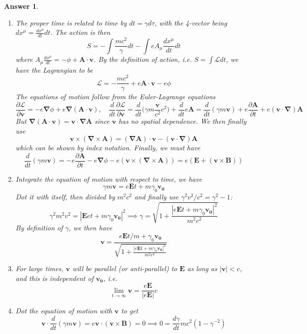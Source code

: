 \documentclass[a4paper]{article}
\newtheorem{ans}{Answer}[section]
\theoremstyle{new}
\begin{document}
\begin{ans}\leavevmode
\begin{enumerate}[label=(\alph*)]
\item The proper time is related to time by $dt=\gamma d\tau$, with the 4-vector being $dx^\mu=\frac{dx^\mu}{dt}dt$. The action is then
$$S=-\int\frac{mc^2}{\gamma}dt-\int eA_\mu\frac{dx^\mu}{dt}dt$$
where $A_\mu\frac{dx^\mu}{dt}=-\phi+\mathbf{A}\cdot\mathbf{v}$. By the definition of action, i.e. $S=\int\mathcal{L}dt$, we have the Lagrangian to be
$$\mathcal{L}=-\frac{mc^2}{\gamma}+e\mathbf{A}\cdot\mathbf{v}-e\phi$$
The equations of motion follow from the Euler-Lagrange equations
$$\frac{\partial\mathcal{L}}{\partial\mathbf{v}}=-e\boldsymbol{\nabla}\phi+e\boldsymbol{\nabla}(\mathbf{A}\cdot\mathbf{v}),\quad\frac{d}{dt}\frac{\partial\mathcal{L}}{\partial\mathbf{v}}=\frac{d}{dt}\bigg(\gamma m\frac{\mathbf{v}}{c^2}c^2\bigg)+\frac{d}{dt}e\mathbf{A}=\frac{d}{dt}(\gamma m\mathbf{v})+e\frac{\partial\mathbf{A}}{\partial t}+e(\mathbf{v}\cdot\boldsymbol{\nabla})\mathbf{A}$$
But $\boldsymbol{\nabla}(\mathbf{A}\cdot\mathbf{v})=\mathbf{v}\cdot\boldsymbol{\nabla}\mathbf{A}$ since $\mathbf{v}$ has no spatial dependence. We then finally use
$$\mathbf{v}\times(\boldsymbol{\nabla}\times\mathbf{A})=(\boldsymbol{\nabla}\mathbf{A})\cdot\mathbf{v}-(\mathbf{v}\cdot\boldsymbol{\nabla})\mathbf{A}$$
which can be shown by index notation. Finally, we must have
$$\frac{d}{dt}(\gamma m\mathbf{v})=-e\frac{\partial\mathbf{A}}{\partial t}-e\boldsymbol{\nabla}\phi-e(\mathbf{v}\times(\boldsymbol{\nabla}\times\mathbf{A}))=e(\mathbf{E}+(\mathbf{v}\times\mathbf{B}))$$
\item Integrate the equation of motion with respect to time, we have
$$\gamma m\mathbf{v}=e\mathbf{E}t+m\gamma_0\mathbf{v_0}$$
Dot it with itself, then divided by $m^2c^2$ and finally use $\gamma^2v^2/c^2=\gamma^2-1$:
$$\gamma^2m^2v^2=|\mathbf{E}et+m\gamma_0\mathbf{v_0}|^2\implies\gamma=\sqrt{1+\frac{|e\mathbf{E}t+m\gamma_0\mathbf{v_0}|^2}{m^2c^2}}$$
By definition of $\gamma$, we then have
$$\mathbf{v}=\frac{e\mathbf{E}t/m+\gamma_0\mathbf{v_0}}{\sqrt{1+\frac{|e\mathbf{E}t+m\gamma_0\mathbf{v_0}|^2}{m^2c^2}}}$$
\item For large times, $\mathbf{v}$ will be parallel (or anti-parallel) to $\mathbf{E}$ as long as $|\mathbf{v}|<c$, and this is independent of $\mathbf{v_0}$, i.e.
$$\lim_{t\rightarrow\infty}\mathbf{v}=\frac{e\mathbf{E}}{|e\mathbf{E}|}c$$
\item Dot the equation of motion with $\mathbf{v}$ to get
$$\mathbf{v}\cdot\frac{d}{dt}(\gamma m\mathbf{v})=e\mathbf{v}\cdot(\mathbf{v}\times\mathbf{B})=0\implies 0=\frac{d\gamma}{dt}mc^2(1-\gamma^{-2})$$

\end{enumerate}
\end{ans}
\end{document}
